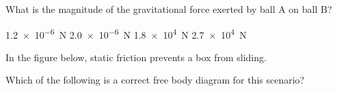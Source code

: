 \documentclass[answers]{exam}
\newif\ifversionKlevel
\begin{document}
\begin{questions}
What is the magnitude of the gravitational force exerted by ball A on ball B?

\begin{randomizeoneparchoices}
    \correctchoice \SI{1.2e-6}{N}
    \choice \SI{2.0e-6}{N}
    \choice \SI{1.8e4}{N}
    \choice \SI{2.7e4}{N}
\end{randomizeoneparchoices}

\ifversionKlevel
\question
In the figure below, static friction prevents a box from sliding.

\begin{center}
\end{center}

Which of the following is a correct free body diagram for this scenario?


\end{questions}
\end{document}
